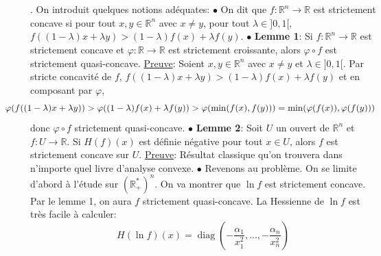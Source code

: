\documentclass{report}
\DeclareMathOperator{\diag}{diag}
\begin{document}
\subsection{} \noindent{}\\ 
\\ 
\\
. On introduit quelques notions adéquates:\newline
$\bullet$ On dit que $f:\mathbb R^n\to \mathbb R$ est strictement concave si pour tout $x,y\in \mathbb R^n$ avec $x\neq y$, pour tout $\lambda\in ]0,1[$, $f((1-\lambda)x+\lambda y) > (1-\lambda)f(x) + \lambda f(y)$.\newline
$\bullet$ \textbf{Lemme 1}: Si $f:\mathbb R^n\to \mathbb R$ est strictement concave et $\varphi: \mathbb R \to \mathbb R$ est strictement croissante, alors $\varphi \circ f$ est strictement quasi-concave.\newline
\underline{Preuve}: Soient $x,y\in \mathbb R^n$ avec $x\neq y$ et $\lambda\in ]0,1[$. Par stricte concavité de $f$, $f((1-\lambda)x+\lambda y) > (1-\lambda)f(x) + \lambda f(y)$ et en composant par $\varphi$, 
$$\hspace*{-1cm}\varphi(f((1-\lambda)x+\lambda y)) > \varphi((1-\lambda)f(x) + \lambda f(y)) > \varphi(\min(f(x),f(y)))=\min(\varphi(f(x)),\varphi(f(y)))$$
donc $\varphi \circ f$ strictement quasi-concave.\newline
$\bullet$ \textbf{Lemme 2}: Soit $U$ un ouvert de $\mathbb R^n$ et $f:U\to \mathbb R$. Si $H(f)(x)$ est définie négative pour tout $x\in U$, alors $f$ est strictement concave sur $U$.\newline
\underline{Preuve}: Résultat classique qu'on trouvera dans n'importe quel livre d'analyse convexe.
\newline \newline
$\bullet$ Revenons au problème. On se limite d'abord à l'étude sur $(\mathbb R_+^*)^n$. \newline
On va montrer que $\ln f$ est strictement concave. Par le lemme 1, on aura $f$ strictement quasi-concave.
La Hessienne de $\ln f$ est très facile à calculer: $$H(\ln f)(x)=\diag(-\frac{\alpha_1}{x_1^2},\ldots, -\frac{\alpha_n}{x_n^2})$$
\end{document}
